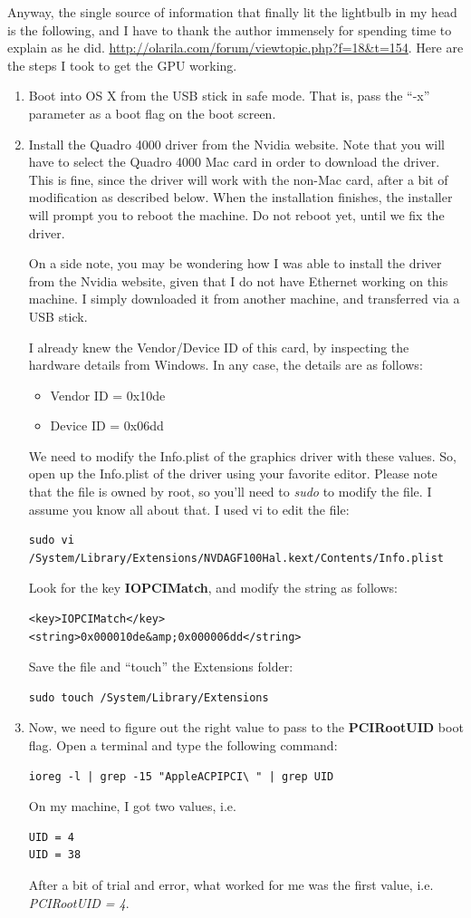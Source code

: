 \documentclass[11pt]{article}
\begin{document}
Anyway, the single source of information that finally lit the lightbulb in my head is the following, and I have to thank the author immensely for spending time to explain as he did.
\url{http://olarila.com/forum/viewtopic.php?f=18&t=154}. Here are the steps I took to get the GPU working.
\begin{enumerate}
\item Boot into OS X from the USB stick in safe mode.  That is, pass the ``-x'' parameter as a boot flag on the boot screen.

\item Install the Quadro 4000 driver from the Nvidia website.  Note that you will have to select the Quadro 4000 Mac card in order to download the driver. This is fine, since the driver will work with the non-Mac card, after a bit of modification as described below.   When the installation finishes, the installer will prompt you to reboot the machine.  Do not reboot yet, until we fix the driver.

On a side note, you may be wondering how I was able to install the driver from the Nvidia website, given that I do not have Ethernet working on this machine.  I simply downloaded it from another machine, and transferred via a USB stick.

I already knew the Vendor/Device ID of this card, by inspecting the hardware details from Windows.  In any case, the details are as follows:
\begin{itemize}
\item Vendor ID = 0x10de
\item Device ID = 0x06dd
\end{itemize}
We need to modify the Info.plist of the graphics driver with these values.  So, open up the Info.plist of the driver using your favorite editor.  Please note that the file is owned by root, so you'll need to {\em sudo} to modify the file.  I assume you know all about that.  I used vi to edit the file:
\begin{verbatim}
sudo vi /System/Library/Extensions/NVDAGF100Hal.kext/Contents/Info.plist 
\end{verbatim}
Look for the key {\bf IOPCIMatch}, and modify the string as follows:
\begin{verbatim}
<key>IOPCIMatch</key>
<string>0x000010de&amp;0x000006dd</string>
\end{verbatim}
Save the file and ``touch'' the Extensions folder:
\begin{verbatim}
sudo touch /System/Library/Extensions
\end{verbatim}

\item Now, we need to figure out the right value to pass to the {\bf PCIRootUID} boot flag.  Open a terminal and type the following command:
\begin{verbatim}
ioreg -l | grep -15 "AppleACPIPCI\ " | grep UID
\end{verbatim}
On my machine, I got two values, i.e. 
\begin{verbatim}
UID = 4
UID = 38
\end{verbatim}
After a bit of trial and error, what worked for me was the first value, i.e. {\em PCIRootUID = 4}.  \end{enumerate}
\end{document}
